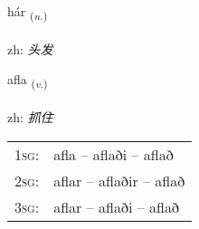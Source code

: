 \documentclass[frontgrid, backgrid]{flacards}\usepackage[]{graphicx}\usepackage[]{color}
\begin{document}
\renewcommand{\flhead}{\vskip5pt \fboxsep=0pt {\small\bfseries\footnotesize Nafnorð | 名词}}
\renewcommand{\fcfoot}{\vskip5pt \fboxsep=0pt \hspace{2pt}{\small\bfseries\footnotesize 2K}}

\renewcommand{\blhead}{\vskip5pt {\small\bfseries\footnotesize Nafnorð | 名词 }}
\renewcommand{\bcfoot}{\vskip5pt \hspace{2pt}{\small\bfseries\footnotesize 2K}}


{hár \small{\textsubscript{(\textit{n.})}} \\[1ex] %
\textphonetic{[hauːr]} \\
zh: \emph{头发} \\  [2ex]
\renewcommand*{\arraystretch}{0.8}
}

\renewcommand{\flhead}{\vskip5pt \fboxsep=0pt {\small\bfseries\footnotesize Sagnorð | 动词}}
\renewcommand{\fcfoot}{\vskip5pt \fboxsep=0pt \hspace{2pt}{\small\bfseries\footnotesize 2K}}

\renewcommand{\blhead}{\vskip5pt {\small\bfseries\footnotesize Sagnorð | 动词 }}
\renewcommand{\bcfoot}{\vskip5pt \hspace{2pt}{\small\bfseries\footnotesize 2K}}


{afla \small{\textsubscript{(\textit{v.})}} \\[1ex] %
\textphonetic{[apla]} \\
zh: \emph{抓住} \\  [2ex]
\renewcommand*{\arraystretch}{0.8}
\begin{tabular}{p{1cm}l}
\textsc{1sg}: & afla -- aflaði -- aflað \\ 
\textsc{2sg}: & aflar -- aflaðir -- aflað \\ 
\textsc{3sg}: & aflar -- aflaði -- aflað \\ 
\end{tabular}
}
\end{document}
